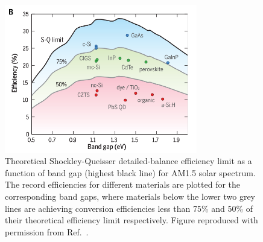 \documentclass[11pt, twoside]{report}
\begin{document}
\begin{figure}[h!]
  \centering
    \includegraphics[width=0.75\textwidth]{figures/SQ_new.png}
    \caption[Theoretical Shockley-Queisser detailed-balance efficiency limit as a function of optical band gap (highest black line) for AM1.5 solar spectrum. The record efficiencies for different materials are plotted for the corresponding band gaps, where materials below the lower two grey lines are achieving conversion efficiencies less than 75\% and 50\% of their theoretical efficiency limit respectively.]{Theoretical Shockley-Queisser detailed-balance efficiency limit \cite{SQ_1961} as a function of band gap (highest black line) for AM1.5 solar spectrum. The record efficiencies for different materials are plotted for the corresponding band gaps, where materials below the lower two grey lines are achieving conversion efficiencies less than 75\% and 50\% of their theoretical efficiency limit respectively. Figure reproduced with permission from Ref.~.}
  \label{SQ}
\end{figure}
\end{document}
